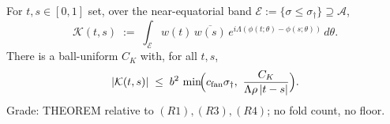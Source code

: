 \begin{lemma}
\label{an17:lem-kernel}
For $t,s\in[0,1]$ set, over the near-equatorial band $\mathcal E:=\{\sigma\le
\sigma_\dagger\}\supseteq\mathcal A$,
\begin{equation}\label{eq:an17-kdef}
 \mathcal K(t,s)\;:=\;\int_{\mathcal E}w(t)\,\overline{w(s)}\,
 e^{i\Lambda(\phi(t;\theta)-\phi(s;\theta))}\,d\theta .
\end{equation}
There is a ball-uniform $C_K$ with, for all $t,s$,
\begin{equation}\label{eq:an17-kbound}
 |\mathcal K(t,s)|\;\le\;b^2\,\min\!\Bigl(c_{\mathrm{fan}}\sigma_\dagger,\
 \frac{C_K}{\Lambda\rho\,|t-s|}\Bigr).
\end{equation}
{\rm Grade: THEOREM} relative to $(R1),(R3),(R4)$; no fold count, no floor.
\end{lemma}

